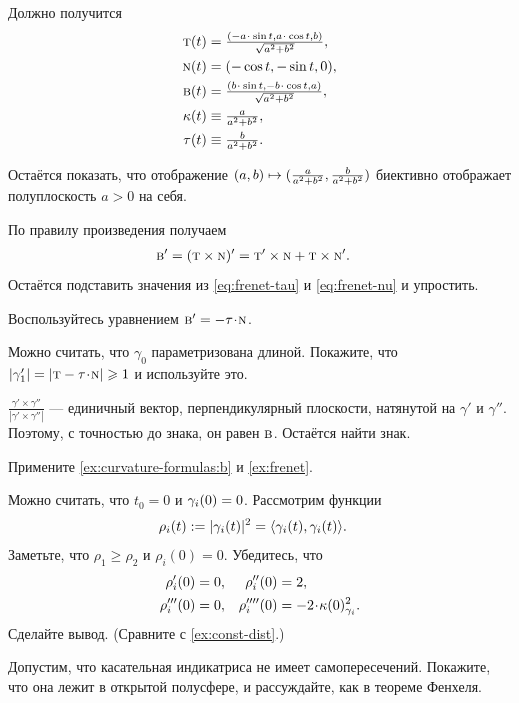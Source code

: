 \begin{multicols}{2}
{Должно получится
\begin{align*}
\tan(t)&=\tfrac{(-a\cdot\sin t, a\cdot\cos t,b)}{\sqrt{a^2+b^2}},
\\
\norm(t)&=(-\cos t,-\sin t,0),
\\
\bi(t)&=\tfrac{(b\cdot \sin t,-b\cdot \cos t, a)}{\sqrt{a^2+b^2}},
\\
\kur(t) &\equiv \tfrac{a}{a^2+b^2},
\\
\tor(t) &\equiv \tfrac{b}{a^2+b^2}.
\end{align*}

Остаётся показать, что отображение $(a,b) \z\mapsto (\frac{a}{a^2+b^2}, \frac{b}{a^2+b^2})$ биективно отображает полуплоскость $a>0$ на себя.

}

По правилу произведения получаем
\begin{align*}
\text{\sc{b}}'&=(\text{\sc{t}}\times \text{\sc{n}})'=
\text{\sc{t}}'\times \text{\sc{n}}+\text{\sc{t}}\times\text{\sc{n}}'.
\end{align*}
Остаётся подставить значения из \ref{eq:frenet-tau} и \ref{eq:frenet-nu} и упростить.

Воспользуйтесь уравнением $\bi' = - \tor\cdot \norm $.

Можно считать, что $\gamma_0$ параметризована длиной.
Покажите, что
$|\gamma_1'|=|\tan-\tor\cdot \norm|\ge 1$ и используйте это.

$\tfrac{\gamma'\times\gamma''}{|\gamma'\times\gamma''|}$ --- единичный вектор, перпендикулярный плоскости, натянутой на $\gamma'$ и $\gamma''$.
Поэтому, с точностью до знака, он равен $\text{\sc{b}}$.
Остаётся найти знак.

Примените \ref{ex:curvature-formulas:b} и \ref{ex:frenet}.

Можно считать, что $t_0=0$ и $\gamma_i(0)\z=0$.
Рассмотрим функции
\begin{align*}
\rho_i(t)&\mathrel{:=}|\gamma_i(t)|^2=\langle \gamma_i(t),\gamma_i(t)\rangle.
\end{align*}
Заметьте, что $\rho_1\ge \rho_2$ и $\rho_i(0)=0$.
Убедитесь, что 
\begin{align*}
\rho_i'(0)&=0,
&
\rho_i''(0)&=2,
\\
\rho_i'''(0)&=0,
&
\rho_i''''(0)&=-2\cdot\kur(0)^2_{\gamma_i}.
\end{align*}
Сделайте вывод. (Сравните с \ref{ex:const-dist}.)

Допустим, что касательная индикатриса не имеет самопересечений.
Покажите, что она лежит в открытой полусфере, и рассуждайте, как в теореме Фенхеля.


\end{multicols}
